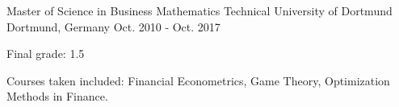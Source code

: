 

\begin{cventries}


  \cventry
    {Master of Science in Business Mathematics} %
    {Technical University of Dortmund} %
    {Dortmund, Germany} %
    {Oct. 2010 - Oct. 2017} %
    {
      \begin{cvitems} %
        \item {Final grade: 1.5}
        \item {Courses taken included: Financial Econometrics, Game Theory, Optimization Methods in Finance.}
      \end{cvitems}
    }


\end{cventries}
